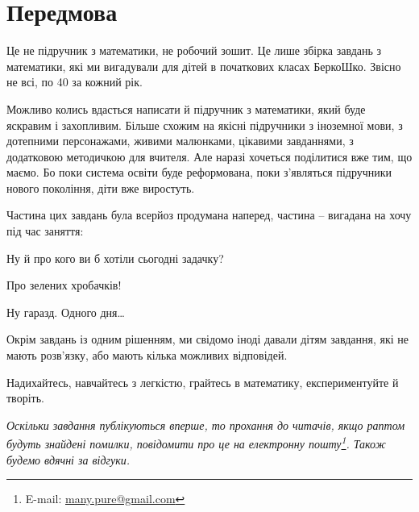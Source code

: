 \chapter*{Передмова}

Це не підручник з математики, не робочий зошит.
Це лише збірка завдань з математики, які ми вигадували для дітей
в початкових класах БеркоШко.
Звісно не всі, по 40 за кожний рік.

Можливо колись вдасться написати й підручник з математики,
який буде яскравим і захопливим.
Більше схожим на якісні підручники з іноземної мови, з дотепними персонажами,
живими малюнками, цікавими завданнями, з додатковою методичкою для вчителя.
Але наразі хочеться поділитися вже тим, що маємо.
Бо поки система освіти буде реформована, поки з’являться підручники
нового покоління, діти вже виростуть.

Частина цих завдань була всерйоз продумана наперед,
частина – вигадана на хочу під час заняття:
\begin{dialogue}
\item Ну й про кого ви б хотіли сьогодні задачку?
\item Про зелених хробачків!
\item Ну гаразд. Одного дня\ldots
\end{dialogue}

Окрім завдань із одним рішенням, ми свідомо іноді давали дітям завдання,
які не мають розв’язку, або мають кілька можливих відповідей.

Надихайтесь, навчайтесь з легкістю, грайтесь в математику,
експериментуйте й творіть. \smiley

\medskip
\medskip

\emph{\small
Оскільки завдання публікуються вперше, то прохання до читачів,
якщо раптом будуть знайдені помилки,
повідомити про це на електронну пошту\footnote{
    E-mail: \url{many.pure@gmail.com}
}. Також будемо вдячні за відгуки.
}%
\smiley
